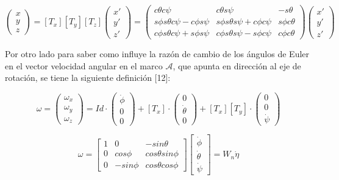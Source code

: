 \documentclass[../main.tex]{subfiles}
\begin{document}
\begin{equation}
\begin{pmatrix}x\\
y\\
z
\end{pmatrix}=[T_{x}][T_{y}][T_{z}]\begin{pmatrix}x'\\
y'\\
z'
\end{pmatrix}=\begin{pmatrix}c\theta c\psi & c\theta s\psi & -s\theta\\
s\phi s\theta c\psi-c\phi s\psi & s\phi s\theta s\psi+c\phi c\psi & s\phi c\theta\\
c\phi s\theta c\psi+s\phi s\psi & c\phi s\theta s\psi-s\phi c\psi & c\phi c\theta
\end{pmatrix}\begin{pmatrix}x'\\
y'\\
z'
\end{pmatrix}
\end{equation}

Por otro lado para saber como influye la razón de cambio de los ángulos
de Euler en el vector velocidad angular en el marco $\mathcal{A}$,
que apunta en dirección al eje de rotación, se tiene la siguiente
definición [12]:

\begin{equation}
\omega=\begin{pmatrix}\omega_{x}\\
\omega_{y}\\
\omega_{z}
\end{pmatrix}=Id\cdot\begin{pmatrix}\dot{\phi}\\
0\\
0
\end{pmatrix}+[T_{x}]\cdot\begin{pmatrix}0\\
\dot{\theta}\\
0
\end{pmatrix}+[T_{x}][T_{y}]\cdot\begin{pmatrix}0\\
0\\
\dot{\psi}
\end{pmatrix}
\end{equation}

\begin{equation}
\omega=\begin{bmatrix}1 & 0 & -sin\theta\\
0 & cos\phi & cos\theta sin\phi\\
0 & -sin\phi & cos\theta cos\phi
\end{bmatrix}\begin{bmatrix}\dot{\phi}\\
\dot{\theta}\\
\dot{\psi}
\end{bmatrix}=W_{n}\dot{\eta}
\end{equation}
\end{document}
